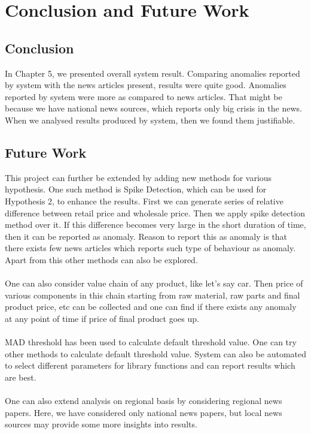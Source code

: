 \chapter{Conclusion and Future Work}

\section{Conclusion}

In Chapter 5, we presented overall system result. Comparing anomalies reported by system with the news articles present, results were quite good. Anomalies reported by system were more as compared to news articles. That might be because we have national news sources, which reports only big crisis in the news. When we analysed results produced by system, then we found them justifiable.

\section{Future Work}

This project can further be extended by adding new methods for various hypothesis. One such method is Spike Detection, which can be used for Hypothesis 2, to enhance the results. First we can generate series of relative difference between retail price and wholesale price. Then we apply spike detection method over it. If this difference becomes very large in the short duration of time, then it can be reported as anomaly. Reason to report this as anomaly is that there exists few news articles which reports such type of behaviour as anomaly. Apart from this other methods can also be explored.\\
\\
One can also consider value chain of any product, like let's say car. Then price of various components in this chain starting from raw material, raw parts and final product price, etc can be collected and one can find if there exists any anomaly at any point of time if price of final product goes up.\\
\\
MAD threshold has been used to calculate default threshold value. One can try other methods to calculate default threshold value. System can also be automated to select different parameters for library functions and can report results which are best.\\
\\
One can also extend analysis on regional basis by considering regional news papers. Here, we have considered only national news papers, but local news sources may provide some more insights into results.
